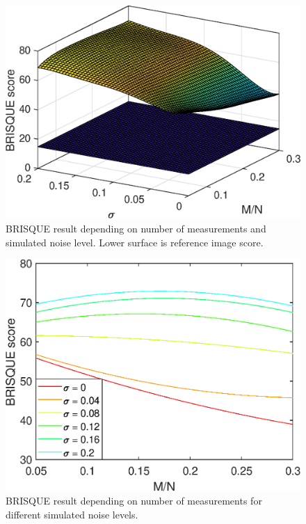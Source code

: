 \begin{figure}[H]
    \centering
    \includegraphics[width = 0.7\linewidth]{result/synt_brisque/BRISQUE_fit.eps}
    \caption{BRISQUE result depending on number of measurements and simulated noise level. Lower surface is reference image score.}
    \label{fig:Brisque_3d}
\end{figure}

\begin{figure}[H]
    \centering
    \includegraphics[width = 0.7\linewidth]{result/synt_brisque/Brisque_fit_flat.eps}
    \caption{BRISQUE result depending on number of measurements for different simulated noise levels.}
    \label{fig:Brisque_2d}
\end{figure}







